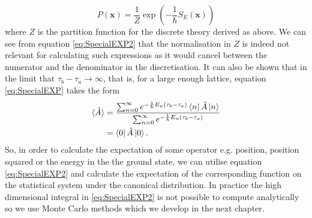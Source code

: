 \documentclass[12pt]{article}
\begin{document}
        \begin{equation}
            P\left(\bm{x}\right) = \frac{1}{Z}\exp{\left(-\frac{1}{\hbar}S_{E}\left(\bm{x}\right)\right)}
        \end{equation}
        where $Z$ is the partition function for the discrete theory derived as above. We can see from equation \ref{eq:SpecialEXP2} that the normalisation in $Z$ is indeed not relevant for calculating such expressions as it would cancel between the numerator and the denominator in the discretisation. It can also be shown that in the limit that $\tau_b - \tau_a \rightarrow \infty$, that is, for a large enough lattice, equation \ref{eq:SpecialEXP} takes the form \cite{creutz_freedman_1981}
        \begin{align}
            \label{eq:LargeLatticeExpectation}
            \braket{\hat{A}} & = \frac{\sum_{n=0}^{\infty}e^{-\frac{1}{\hbar}E_n\left(\tau_b-\tau_a\right)}\bra{n}\hat{A}\ket{n}}{\sum_{n=0}^{\infty}e^{-\frac{1}{\hbar}E_n\left(\tau_b-\tau_a\right)}} \\
            & = \bra{0}\hat{A}\ket{0}.
        \end{align}
        So, in order to calculate the expectation of some operator e.g. position, position squared or the energy in the the ground state, we can utilise equation \ref{eq:SpecialEXP2} and calculate the expectation of the corresponding function on the statistical system under the canonical distribution.  In practice the high dimensional integral in \ref{eq:SpecialEXP2} is not possible to compute analytically so we use Monte Carlo methods which we develop in the next chapter.
\end{document}
